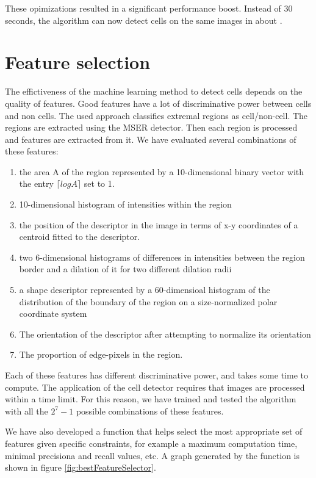 	These opimizations resulted in a significant performance boost. Instead of 30 seconds, the algorithm can now detect cells on the same images in about .
	
	\section{Feature selection }
	
	The effictiveness of the machine learning method to detect cells depends on the quality of features. Good features have a lot of discriminative power between cells and non cells. The used approach classifies extremal regions as cell/non-cell. The regions are extracted using the MSER detector. Then each region is processed and features are extracted from it. We have evaluated several combinations of these features:
	
	\begin{enumerate}
	    \item the area A of the region represented by a 10-dimensional binary vector with the entry $\lceil log A \rceil $ set to 1.
		\item 10-dimensional histogram of intensities within the region
	    \item the position of the descriptor in the image in terms of x-y coordinates of a centroid fitted to the descriptor.
	    \item two 6-dimensional histograms of differences in intensities between the region border and a dilation of it for two different dilation radii
	    \item a shape descriptor represented by a 60-dimensioal histogram of the distribution of the boundary of the region on a size-normalized polar coordinate system
	    \item The orientation of the descriptor after attempting to normalize its orientation
	    \item The proportion of edge-pixels in the region.
	\end{enumerate}
	
	Each of these features has different discriminative power, and takes some time to compute. The application of the cell detector requires that images are processed within a time limit. For this reason, we have trained and tested the algorithm with all the $2^7 - 1$ possible combinations of these features.
	
	We have also developed a function that helps select the most appropriate set of features given specific constraints, for example a maximum computation time, minimal precisiona and recall values, etc. A graph generated by the function is shown in figure \ref{fig:bestFeatureSelector}.
	
